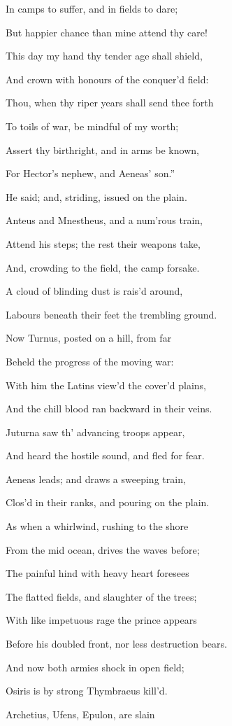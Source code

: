 In camps to suffer, and in fields to dare;

But happier chance than mine attend thy care!

This day my hand thy tender age shall shield,

And crown with honours of the conquer’d field:

Thou, when thy riper years shall send thee forth

To toils of war, be mindful of my worth;

Assert thy birthright, and in arms be known,

For Hector’s nephew, and Aeneas’ son.”

He said; and, striding, issued on the plain.

Anteus and Mnestheus, and a num’rous train,

Attend his steps; the rest their weapons take,

And, crowding to the field, the camp forsake.

A cloud of blinding dust is rais’d around,

Labours beneath their feet the trembling ground.

Now Turnus, posted on a hill, from far

Beheld the progress of the moving war:

With him the Latins view’d the cover’d plains,

And the chill blood ran backward in their veins.

Juturna saw th’ advancing troops appear,

And heard the hostile sound, and fled for fear.

Aeneas leads; and draws a sweeping train,

Clos’d in their ranks, and pouring on the plain.

As when a whirlwind, rushing to the shore

From the mid ocean, drives the waves before;

The painful hind with heavy heart foresees

The flatted fields, and slaughter of the trees;

With like impetuous rage the prince appears

Before his doubled front, nor less destruction bears.

And now both armies shock in open field;

Osiris is by strong Thymbraeus kill’d.

Archetius, Ufens, Epulon, are slain


